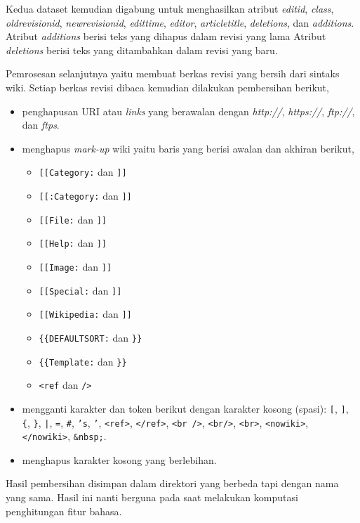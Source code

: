 Kedua dataset kemudian digabung untuk menghasilkan atribut \textit{editid},
\textit{class}, \textit{oldrevisionid}, \textit{newrevisionid},
\textit{edittime}, \textit{editor}, \textit{articletitle}, \textit{deletions},
dan \textit{additions}.
Atribut \textit{additions} berisi teks yang dihapus dalam revisi yang lama
Atribut \textit{deletions} berisi teks yang ditambahkan dalam revisi yang baru.

Pemrosesan selanjutnya yaitu membuat berkas revisi yang bersih dari sintaks
wiki.
Setiap berkas revisi dibaca kemudian dilakukan pembersihan berikut,

\begin{itemize}
\item penghapusan URI atau \textit{links} yang berawalan dengan
\textit{http://}, \textit{https://}, \textit{ftp://}, dan \textit{ftps}.
\item menghapus \textit{mark-up} wiki yaitu baris yang berisi awalan dan
akhiran berikut,
	\begin{itemize}
	\item \texttt{[[Category:} dan \texttt{]]}
	\item \texttt{[[:Category:} dan \texttt{]]}
	\item \texttt{[[File:} dan \texttt{]]}
	\item \texttt{[[Help:} dan \texttt{]]}
	\item \texttt{[[Image:} dan \texttt{]]}
	\item \texttt{[[Special:} dan \texttt{]]}
	\item \texttt{[[Wikipedia:} dan \texttt{]]}
	\item \texttt{\{\{DEFAULTSORT:} dan \texttt{\}\}}
	\item \texttt{\{\{Template:} dan \texttt{\}\}}
	\item \texttt{<ref} dan \texttt{/>}
	\end{itemize}
\item mengganti karakter dan token berikut dengan karakter kosong (spasi):
\texttt{[}, \texttt{]}, \texttt{\{}, \texttt{\}}, \texttt{|}, \texttt{=},
\texttt{\#}, \texttt{'s}, \texttt{'}, \texttt{<ref>}, \texttt{</ref>},
\texttt{<br />}, \texttt{<br/>}, \texttt{<br>}, \texttt{<nowiki>},
\texttt{</nowiki>}, \texttt{\&nbsp;}.
\item menghapus karakter kosong yang berlebihan.
\end{itemize}

Hasil pembersihan disimpan dalam direktori yang berbeda tapi dengan nama yang
sama.
Hasil ini nanti berguna pada saat melakukan komputasi penghitungan fitur
bahasa.
